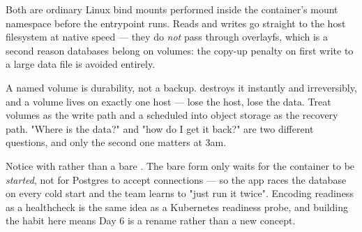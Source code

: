  Both are ordinary Linux bind mounts performed inside the container's mount namespace before the entrypoint runs. Reads and writes go straight to the host filesystem at native speed --- they do \emph{not} pass through overlayfs, which is a second reason databases belong on volumes: the copy-up penalty on first write to a large data file is avoided entirely.


\begin{drtip}
A named volume is durability, not a backup.  destroys it instantly and irreversibly, and a volume lives on exactly one host --- lose the host, lose the data. Treat volumes as the write path and a scheduled  into object storage as the recovery path. "Where is the data?" and "how do I get it back?" are two different questions, and only the second one matters at 3am.
\end{drtip}

\begin{seniornote}
Notice  with  rather than a bare . The bare form only waits for the container to be \emph{started}, not for Postgres to accept connections --- so the app races the database on every cold start and the team learns to "just run it twice". Encoding readiness as a healthcheck is the same idea as a Kubernetes readiness probe, and building the habit here means Day 6 is a rename rather than a new concept.
\end{seniornote}

